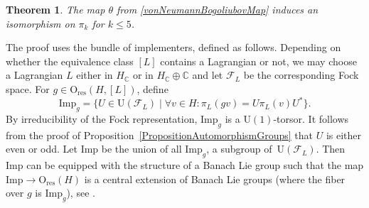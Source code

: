 \documentclass[11pt]{article}
\numberwithin{equation}{section}
\numberwithin{equation}{section}
\newtheorem{Theorem}{Theorem}[section]
\newcommand{\C}{\mathbb{C}}
\newcommand{\res}{\mathrm{res}}
\newcommand{\Imp}{\mathrm{Imp}}
\newcommand{\U}{\mathrm{U}}
\renewcommand{\O}{\mathrm{O}}
\begin{document}
\begin{Theorem} \label{TheoremIsoPileq2}
The map $\theta$ from \eqref{vonNeumannBogoliubovMap} induces an isomorphism on $\pi_k$ for $k \leq 5$.
\end{Theorem}

The proof uses the bundle of implementers, defined as follows.
Depending on whether the equivalence class $[L]$ contains a Lagrangian or not, we may choose a Lagrangian $L$ either in $H_\C$ or in $H_\C \oplus \C$ and let $\mathcal{F}_L$ be the corresponding Fock space.
For $g \in \O_{\res}(H, [L])$, define
\begin{equation*}
 \Imp_g = \{ U \in \U(\mathcal{F}_L) \mid \forall v \in H\colon \pi_L (g v) = U \pi_L(v) U^*\}.
\end{equation*}
By irreducibility of the Fock representation, $\Imp_g$ is a $\U(1)$-torsor.
It follows from the proof of Proposition~\ref{PropositionAutomorphismGroups} that $U$ is either even or odd.
Let $\Imp$ be the union of all $\Imp_g$, a subgroup of~$\U(\mathcal{F}_L)$.
Then $\Imp$ can be equipped with the structure of a Banach Lie group such that the map $\Imp \to \O_{\res}(H)$ is a central extension of Banach Lie groups (where the fiber over $g$ is $\Imp_g$), see \cite[Section~3.5]{KristelWaldorf1}.
\end{document}
